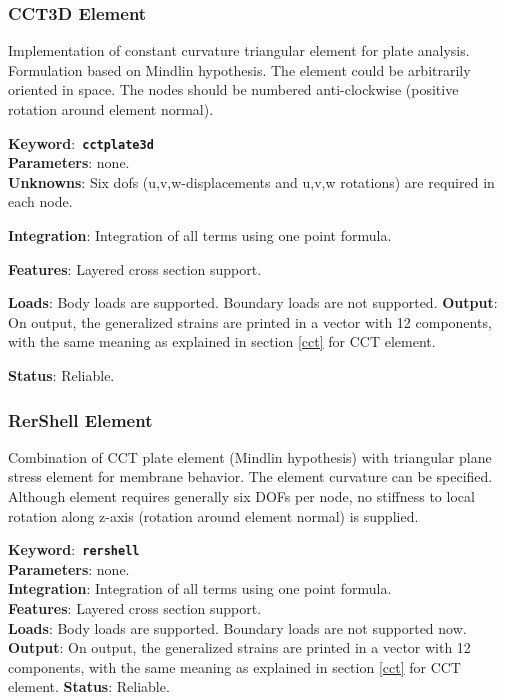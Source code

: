 \documentclass[a4paper]{article}
\newcommand{\descitem}[1]{{\noindent \bf #1}:}
\newcommand{\elemkeyword}[1]{\descitem{Keyword}~{\bf \texttt{#1}}}
\begin{document}
\subsubsection {CCT3D Element}
Implementation of constant curvature triangular element for plate
analysis. Formulation based on Mindlin hypothesis. The element could be arbitrarily oriented in space. 
The nodes should be numbered anti-clockwise (positive rotation around element normal). 


\elemkeyword{cctplate3d}\\
\descitem{Parameters} none.\\
\descitem{Unknowns}
Six dofs (u,v,w-displacements and u,v,w rotations) are required in each node.


\descitem{Integration}
Integration of all terms using one point formula.

\descitem{Features} Layered cross section support.

\descitem{Loads} Body loads are supported. Boundary loads are
not supported.
\descitem{Output} On output, the generalized strains are printed in a vector with 12 components, with the same meaning as explained in section \ref{cct} for CCT element.

\descitem{Status} Reliable.

\subsubsection {RerShell Element}
Combination of CCT plate element (Mindlin hypothesis) with triangular plane stress element
for membrane behavior. The element curvature can be specified. 
Although element requires generally six DOFs per node, no stiffness to
local rotation along z-axis (rotation around element normal) is supplied.

\elemkeyword{rershell}\\
\descitem{Parameters} none.\\
\descitem{Integration}
Integration of all terms using one point formula.\\
\descitem{Features} Layered cross section support.\\
\descitem{Loads} Body loads are supported. Boundary loads are
not supported now.\\
\descitem{Output} On output, the generalized strains are printed in a vector with 12 components, with the same meaning as explained in section \ref{cct} for CCT element.
\descitem{Status} Reliable.
\end{document}
